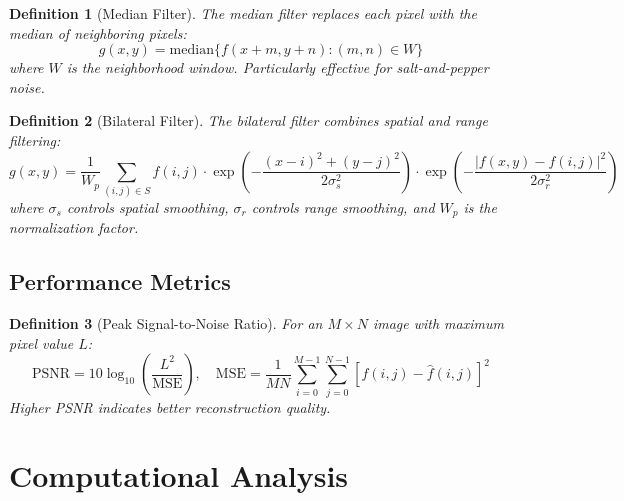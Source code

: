 \documentclass[a4paper, 11pt]{article}
\newtheorem{definition}{Definition}[section]
\begin{document}
\begin{definition}[Median Filter]
The median filter replaces each pixel with the median of neighboring pixels:
\begin{equation}
g(x,y) = \text{median}\{f(x+m, y+n) : (m,n) \in W\}
\end{equation}
where $W$ is the neighborhood window. Particularly effective for salt-and-pepper noise.
\end{definition}

\begin{definition}[Bilateral Filter]
The bilateral filter combines spatial and range filtering:
\begin{equation}
g(x,y) = \frac{1}{W_p} \sum_{(i,j) \in S} f(i,j) \cdot \exp\left(-\frac{(x-i)^2+(y-j)^2}{2\sigma_s^2}\right) \cdot \exp\left(-\frac{|f(x,y)-f(i,j)|^2}{2\sigma_r^2}\right)
\end{equation}
where $\sigma_s$ controls spatial smoothing, $\sigma_r$ controls range smoothing, and $W_p$ is the normalization factor.
\end{definition}

\subsection{Performance Metrics}

\begin{definition}[Peak Signal-to-Noise Ratio]
For an $M \times N$ image with maximum pixel value $L$:
\begin{equation}
\text{PSNR} = 10 \log_{10}\left(\frac{L^2}{\text{MSE}}\right), \quad \text{MSE} = \frac{1}{MN}\sum_{i=0}^{M-1}\sum_{j=0}^{N-1}[f(i,j) - \hat{f}(i,j)]^2
\end{equation}
Higher PSNR indicates better reconstruction quality.
\end{definition}

\section{Computational Analysis}
\end{document}
